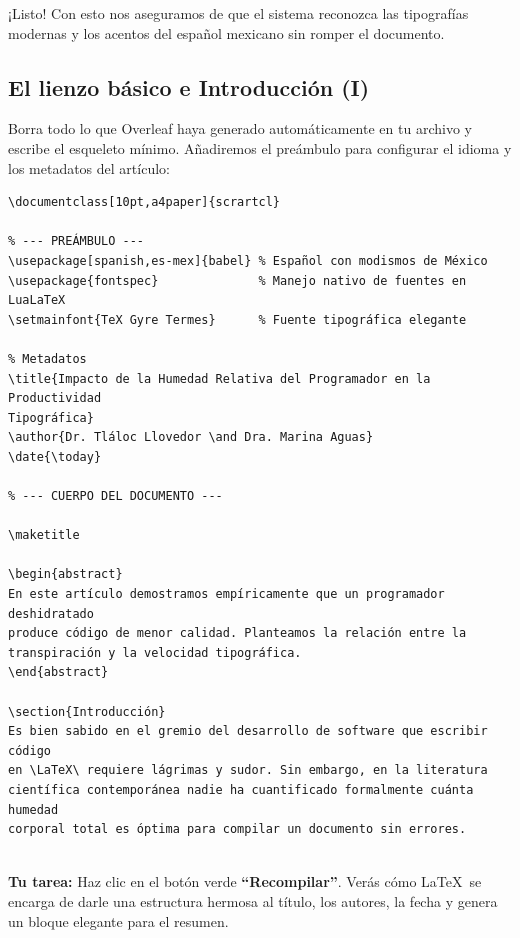 ¡Listo! Con esto nos aseguramos de que el sistema reconozca las tipografías
modernas y los acentos del español mexicano sin romper el documento.

\subsection*{ El lienzo básico e Introducción (I)}
\label{sub:paso1_intro}

Borra todo lo que Overleaf haya generado automáticamente en tu archivo y
escribe el esqueleto mínimo. Añadiremos el preámbulo para configurar el
idioma y los metadatos del artículo:

\begin{verbatim}
\documentclass[10pt,a4paper]{scrartcl} 

% --- PREÁMBULO ---
\usepackage[spanish,es-mex]{babel} % Español con modismos de México
\usepackage{fontspec}              % Manejo nativo de fuentes en LuaLaTeX
\setmainfont{TeX Gyre Termes}      % Fuente tipográfica elegante

% Metadatos
\title{Impacto de la Humedad Relativa del Programador en la Productividad
Tipográfica}
\author{Dr. Tláloc Llovedor \and Dra. Marina Aguas}
\date{\today}

% --- CUERPO DEL DOCUMENTO ---

\maketitle

\begin{abstract}
En este artículo demostramos empíricamente que un programador deshidratado
produce código de menor calidad. Planteamos la relación entre la 
transpiración y la velocidad tipográfica.
\end{abstract}

\section{Introducción}
Es bien sabido en el gremio del desarrollo de software que escribir código
en \LaTeX\ requiere lágrimas y sudor. Sin embargo, en la literatura
científica contemporánea nadie ha cuantificado formalmente cuánta humedad
corporal total es óptima para compilar un documento sin errores.


\end{verbatim}

\textbf{Tu tarea:} Haz clic en el botón verde \textbf{“Recompilar”}. Verás
cómo \LaTeX\ se encarga de darle una estructura hermosa al título, los
autores, la fecha y genera un bloque elegante para el resumen.

